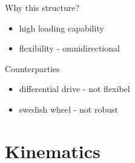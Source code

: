 \documentclass[10pt]{beamer}
\begin{document}
\begin{frame}{Why this structure?}
   \begin{itemize}
       \item high loading capability
       \item flexibility - omnidirectional
   \end{itemize}
\end{frame}


\begin{frame}{Counterparties}
    \begin{itemize}
        \item differential drive - not flexibel
        \item swedish wheel - not robust
    \end{itemize}
\end{frame}

\section{Kinematics}
\end{document}
